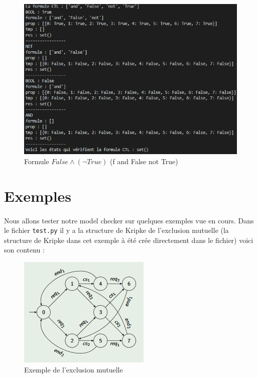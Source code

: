 \documentclass[12pt,a4paper]{report}
\begin{document}
\begin{figure}[H]
  \centering
      \includegraphics[scale=0.75]{Images/resultat_main_2.PNG}
  \caption{Formule $False\land (\neg True)$ (f and False not True)}
\end{figure}

\section*{Exemples}

\paragraph{}Nous allons tester notre model checker sur quelques exemples vue en cours. Dans le fichier \verb+test.py+ il y a la structure de Kripke de l'exclusion mutuelle (la structure de Kripke dans cet exemple à été crée directement dans le fichier) voici son contenu :

\begin{figure}[H]
  \centering
      \includegraphics[scale=1]{Images/exclusion_mutuelle.PNG}
  \caption{Exemple de l'exclusion mutuelle}
\end{figure}
\end{document}
